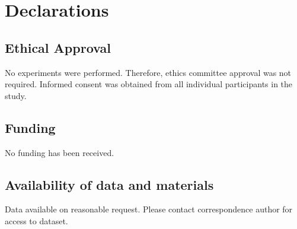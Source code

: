 \documentclass[preprint,12pt]{elsarticle}
\begin{document}
\clearpage
\section*{Declarations}
\subsection*{Ethical Approval} 
No experiments were performed. Therefore, ethics committee approval was not required. Informed consent was obtained from all individual participants in the study.

\subsection*{Funding}
No funding has been received.

\subsection*{Availability of data and materials }
Data available on reasonable request. Please contact correspondence author for access to dataset.
\end{document}
